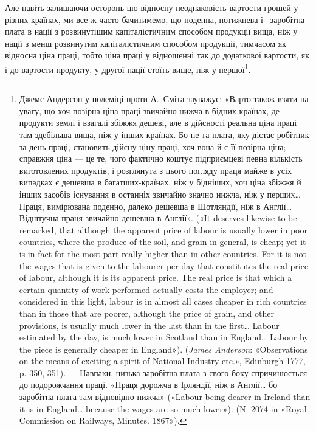 Але навіть залишаючи осторонь цю відносну неоднаковість
вартости грошей у різних країнах, ми все ж часто бачитимемо,
що поденна, потижнева і~ заробітна плата в нації з розвинутішим
капіталістичним способом продукції вища, ніж у нації
з менш розвинутим капіталістичним способом продукції, тимчасом
як відносна ціна праці, тобто ціна праці у відношенні
так до додаткової вартости, як і до вартости продукту, у другої
нації стоїть вище, ніж у першої\footnote{
Джемс Андерсон у полеміці проти А.~Сміта зауважує: «Варто
також взяти на увагу, що хоч позірна ціна праці звичайно нижча в бідних
країнах, де продукти землі і взагалі збіжжя дешеві, але в дійсності
реальна ціна праці там здебільша вища, ніж у інших країнах. Бо не та
плата, яку дістає робітник за день праці, становить дійсну ціну праці,
хоч вона й є її позірна ціна; справжня ціна — це те, чого фактично коштує
підприємцеві певна кількість виготовлених продуктів, і розглянута з
цього погляду праця майже в усіх випадках є дешевша в багатших-країнах,
ніж у бідніших, хоч ціна збіжжя й інших засобів існування в останніх
звичайно значно нижча, ніж у перших\dots{} Праця, вимірювана поденно,
далеко дешевша в Шотляндії, ніж в Англії\dots{} Відштучна праця звичайно
дешевша в Англії». («It deserves likewise to be remarked, that although the
apparent price of labour is usually lower in poor countries, where the
produce of the soil, and grain in general, is cheap; yet it is in fact for the
most part really higher than in other countries. For it is not the wages that
is given to the labourer per day that constitutes the real price of labour,
although it is its apparent price. The real price is that which a certain
quantity of work performed actually costs the employer; and considered
in this light, labour is in almost all cases cheaper in rich countries than in
those that are poorer, although the price of grain, and other provisions, is
usually much lower in the last than in the first\dots{} Labour estimated by
the day, is much lower in Scotland than in England\dots{} Labour by the piece
is generally cheaper in England»). (\emph{James Anderson}: «Observations on
the means of exciting a spirit of National Industry etc.», Edinburgh 1777,
p. 350, 351). — Навпаки, низька заробітна плата з свого боку спричинюється
до подорожчання праці. «Праця дорожча в Ірляндії, ніж в Англії\dots{}
бо заробітна плата там відповідно нижча» («Labour being dearer in Ireland
than it is in England\dots{} because the wages are so much lower»).
(N. 2074 in «Royal Commission on Railways, Minutes. 1867»).
}.

